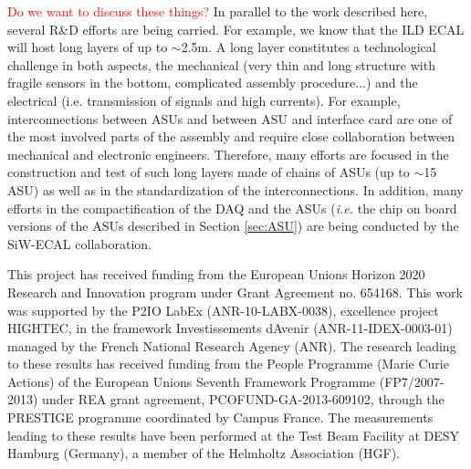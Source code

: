 \documentclass[a4paper,11pt]{article}
\newcommand{\todo}[1]{\textcolor{red}{{#1}}}
\begin{document}
\todo{Do we want to discuss these things?}
In parallel to the work described here, several R\&D efforts are being carried.
For example, we know that the ILD ECAL will host long layers of up to $\sim$2.5m.
A long layer constitutes a technological challenge in both aspects, the mechanical
(very thin and long structure with fragile sensors in the bottom, complicated assembly procedure...)
and the electrical (i.e. transmission of signals and high currents).
For example, interconnections between ASUs and between ASU and interface card are one of
the most involved parts of the assembly
and require close collaboration between mechanical and electronic engineers.
Therefore, many efforts are focused in the construction and test of such long 
layers made of chains of ASUs (up to $\sim$15 ASU) 
as well as in the standardization of the interconnections. 
In addition, many efforts in the compactification of
the DAQ and the ASUs ({\it i.e.} the chip on board versions of the 
ASUs described in Section \ref{sec:ASU}) are being
conducted by the SiW-ECAL collaboration.


\acknowledgments

This project has received funding from the European Union{\textquotesingle}s Horizon 2020 Research and Innovation program under Grant Agreement no. 654168.
This work was supported by the P2IO LabEx (ANR-10-LABX-0038), excellence project HIGHTEC,
in the framework {\textquotesingle}Investissements d{\textquotesingle}Avenir{\textquotesingle}
(ANR-11-IDEX-0003-01) managed by the French National Research Agency (ANR).
The research leading to these results has received funding from the People Programme (Marie
Curie Actions) of the European Union{\textquotesingle}s Seventh Framework Programme (FP7/2007-2013)
under REA grant agreement, PCOFUND-GA-2013-609102, through the PRESTIGE
programme coordinated by Campus France.
The measurements leading to these results have been performed at the Test Beam Facility at DESY Hamburg (Germany), a member of the Helmholtz Association (HGF).





\end{document}
